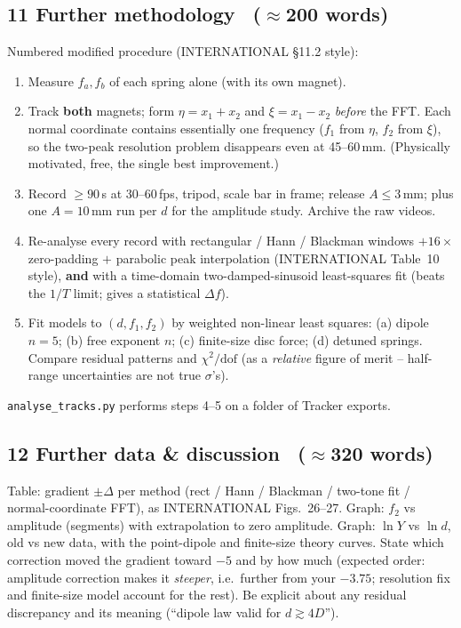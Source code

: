 \documentclass[11pt,a4paper]{article}
\newcommand{\Y}{Y}                       %
\newcommand{\words}[1]{~{\small\color{gray}($\approx$#1 words)}}
\begin{document}
\subsection*{11 Further methodology \words{200}}
Numbered modified procedure (INTERNATIONAL \S11.2 style):
\begin{enumerate}
\item Measure $f_a,f_b$ of each spring alone (with its own magnet).
\item Track \textbf{both} magnets; form $\eta=x_1+x_2$ and $\xi=x_1-x_2$ \emph{before} the
FFT. Each normal coordinate contains essentially one frequency ($f_1$ from $\eta$, $f_2$ from
$\xi$), so the two-peak resolution problem disappears even at 45--60\,mm. (Physically
motivated, free, the single best improvement.)
\item Record $\ge90$\,s at 30--60\,fps, tripod, scale bar in frame; release $A\le3$\,mm; plus
one $A=10$\,mm run per $d$ for the amplitude study. Archive the raw videos.
\item Re-analyse every record with rectangular / Hann / Blackman windows $+16\times$
zero-padding $+$ parabolic peak interpolation (INTERNATIONAL Table~10 style), \textbf{and}
with a time-domain two-damped-sinusoid least-squares fit (beats the $1/T$ limit; gives a
statistical $\Delta f$).
\item Fit models to $(d,f_1,f_2)$ by weighted non-linear least squares: (a) dipole $n=5$;
(b) free exponent $n$; (c) finite-size disc force; (d) detuned springs. Compare residual
patterns and $\chi^2/\text{dof}$ (as a \emph{relative} figure of merit -- half-range
uncertainties are not true $\sigma$'s).
\end{enumerate}
\texttt{analyse\_tracks.py} performs steps 4--5 on a folder of Tracker exports.

\subsection*{12 Further data \& discussion \words{320}}
Table: gradient $\pm\Delta$ per method (rect / Hann / Blackman / two-tone fit /
normal-coordinate FFT), as INTERNATIONAL Figs.~26--27. Graph: $f_2$ vs amplitude (segments)
with extrapolation to zero amplitude. Graph: $\ln\Y$ vs $\ln d$, old vs new data, with the
point-dipole and finite-size theory curves. State which correction moved the gradient toward
$-5$ and by how much (expected order: amplitude correction makes it \emph{steeper}, i.e.\
further from your $-3.75$; resolution fix and finite-size model account for the rest). Be
explicit about any residual discrepancy and its meaning (``dipole law valid for
$d\gtrsim4D$'').
\end{document}
